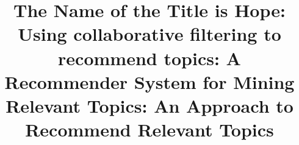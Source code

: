\documentclass[sigconf,review, anonymous,screen]{acmart}
\begin{document}
\title{The Name of the Title is Hope}

\title{\CT: Using collaborative filtering to recommend \GH topics}

\title{\TF: A Recommender System for Mining Relevant \GH Topics}

\title{\CT: An Approach to Recommend Relevant \GH Topics}%







 
\end{document}
